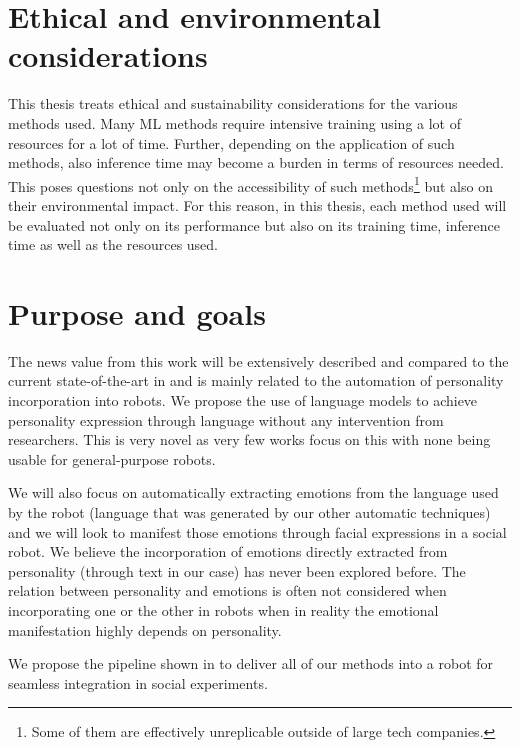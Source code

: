 \documentclass[nomenclature, english, biblatex]{kththesis}
\begin{document}
\section{Ethical and environmental considerations}
This thesis treats ethical and sustainability considerations for the various methods used. Many \gls{ML} methods require intensive training using a lot of resources for a lot of time. Further, depending on the application of such methods, also inference time may become a burden in terms of resources needed. This poses questions not only on the accessibility of such methods\footnote{Some of them are effectively unreplicable outside of large tech companies.} but also on their environmental impact. For this reason, in this thesis, each method used will be evaluated not only on its performance but also on its training time, inference time as well as the resources used. 

\section{Purpose and goals}
The news value from this work will be extensively described and compared to the current state-of-the-art in  and is mainly related to the automation of personality incorporation into robots. We propose the use of language models to achieve personality expression through language without any intervention from researchers. This is very novel as very few works focus on this with none being usable for general-purpose robots.

We will also focus on automatically extracting emotions from the language used by the robot (language that was generated by our other automatic techniques) and we will look to manifest those emotions through facial expressions in a social robot. We believe the incorporation of emotions directly extracted from personality (through text in our case) has never been explored before. The relation between personality and emotions is often not considered when incorporating one or the other in robots when in reality the emotional manifestation highly depends on personality.

We propose the pipeline shown in  to deliver all of our methods into a robot for seamless integration in social experiments.
\end{document}
